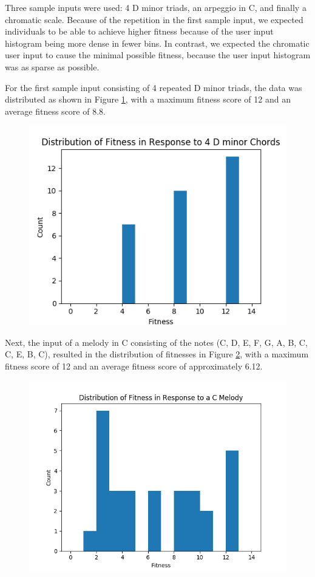 \documentclass[conference]{IEEEtran}
\begin{document}
Three sample inputs were used: 4 D minor triads, an arpeggio in C, and finally a chromatic scale. Because of the repetition in the first sample input, we expected individuals to be able to achieve higher fitness because of the user input histogram being more dense in fewer bins. In contrast, we expected the chromatic user input to cause the minimal possible fitness, because the user input histogram was as sparse as possible. 

For the first sample input consisting of 4 repeated D minor triads, the data was distributed as shown in Figure \ref{fig:dminordist}, with a maximum fitness score of 12 and an average fitness score of 8.8. 


\begin{figure}[H]
	\centering
	\includegraphics[width=0.8\linewidth]{dMinorDist}
	\caption{}
	\label{fig:dminordist}
\end{figure}


Next, the input of a melody in C consisting of the notes (C, D, E, F, G, A, B, C, C, E, B, C), resulted in the distribution of fitnesses in Figure \ref{fig:cmelodydist}, with a maximum fitness score of 12 and an average fitness score of  approximately 6.12. 


\begin{figure}[H]
	\centering
	\includegraphics[width=0.8\linewidth]{cMelodyDist}
	\caption{}
	\label{fig:cmelodydist}
\end{figure}
\end{document}
